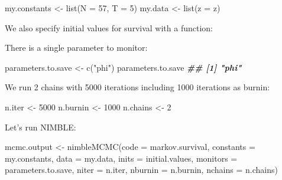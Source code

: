 \documentclass[
  12pt,
]{krantz}
\newenvironment{Shaded}{\begin{snugshade}}{\end{snugshade}}
\newcommand{\AttributeTok}[1]{\textcolor[rgb]{0.77,0.63,0.00}{#1}}
\newcommand{\ControlFlowTok}[1]{\textcolor[rgb]{0.13,0.29,0.53}{\textbf{#1}}}
\newcommand{\DecValTok}[1]{\textcolor[rgb]{0.00,0.00,0.81}{#1}}
\newcommand{\DocumentationTok}[1]{\textcolor[rgb]{0.56,0.35,0.01}{\textbf{\textit{#1}}}}
\newcommand{\FunctionTok}[1]{\textcolor[rgb]{0.00,0.00,0.00}{#1}}
\newcommand{\NormalTok}[1]{#1}
\newcommand{\OtherTok}[1]{\textcolor[rgb]{0.56,0.35,0.01}{#1}}
\newcommand{\StringTok}[1]{\textcolor[rgb]{0.31,0.60,0.02}{#1}}
\begin{document}
\begin{Shaded}
\begin{Highlighting}[]
\NormalTok{my.constants }\OtherTok{\textless{}{-}} \FunctionTok{list}\NormalTok{(}\AttributeTok{N =} \DecValTok{57}\NormalTok{, }\AttributeTok{T =} \DecValTok{5}\NormalTok{)}
\NormalTok{my.data }\OtherTok{\textless{}{-}} \FunctionTok{list}\NormalTok{(}\AttributeTok{z =}\NormalTok{ z)}
\end{Highlighting}
\end{Shaded}

We also specify initial values for survival with a function:

\begin{Shaded}
\end{Shaded}

There is a single parameter to monitor:

\begin{Shaded}
\begin{Highlighting}[]
\NormalTok{parameters.to.save }\OtherTok{\textless{}{-}} \FunctionTok{c}\NormalTok{(}\StringTok{"phi"}\NormalTok{)}
\NormalTok{parameters.to.save}
\DocumentationTok{\#\# [1] "phi"}
\end{Highlighting}
\end{Shaded}

We run 2 chains with 5000 iterations including 1000 iterations as burnin:

\begin{Shaded}
\begin{Highlighting}[]
\NormalTok{n.iter }\OtherTok{\textless{}{-}} \DecValTok{5000}
\NormalTok{n.burnin }\OtherTok{\textless{}{-}} \DecValTok{1000}
\NormalTok{n.chains }\OtherTok{\textless{}{-}} \DecValTok{2}
\end{Highlighting}
\end{Shaded}

Let's run NIMBLE:

\begin{Shaded}
\begin{Highlighting}[]
\NormalTok{mcmc.output }\OtherTok{\textless{}{-}} \FunctionTok{nimbleMCMC}\NormalTok{(}\AttributeTok{code =}\NormalTok{ markov.survival,}
                          \AttributeTok{constants =}\NormalTok{ my.constants,}
                          \AttributeTok{data =}\NormalTok{ my.data,}
                          \AttributeTok{inits =}\NormalTok{ initial.values,}
                          \AttributeTok{monitors =}\NormalTok{ parameters.to.save,}
                          \AttributeTok{niter =}\NormalTok{ n.iter,}
                          \AttributeTok{nburnin =}\NormalTok{ n.burnin,}
                          \AttributeTok{nchains =}\NormalTok{ n.chains)}
\end{Highlighting}
\end{Shaded}
\end{document}
